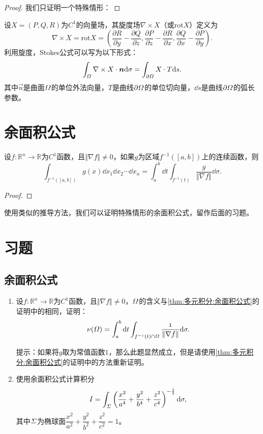    \begin{proof}
        我们只证明一个特殊情形：
    \end{proof}
    
    设\(X=(P,Q,R)\)为\(C^1\)的向量场，其旋度场\(\nabla\times X\)（或\(\mathrm{rot}X\)）定义为\[\nabla\times X=\mathrm{rot}X=\left(\frac{\partial R}{\partial y}-\frac{\partial Q}{\partial z},\frac{\partial P}{\partial z}-\frac{\partial R}{\partial x},\frac{\partial Q}{\partial x}-\frac{\partial P}{\partial y}\right).\]利用旋度，Stokes公式可以写为以下形式：\[\int_{\mit\Omega}\nabla\times X\cdot\boldsymbol{n}\mathrm{d}\sigma=\int_{\partial\mit\Omega}X\cdot T\mathrm{d} s.\]其中\(\vec{n}\)是曲面\(\mit\Omega\)的单位外法向量，\(T\)是曲线\(\partial\mit\Omega\)的单位切向量，\(\dd s\)是曲线\(\partial\mit\Omega\)的弧长参数。

\section{余面积公式}
    \begin{theorem}[余面积公式] \label{thm:多元积分:余面积公式}
        设\(f:\mathbb{R}^n\to\mathbb{R}\)为\(C^1\)函数，且\(\Vert\nabla f\Vert\neq0\)，如果\(g\)为区域\(f^{-1}(\left[a,b\right])\)上的连续函数，则\[\int_{f^{-1}(\left[a,b\right])}g(x)\dd x_1\dd x_2\cdots\dd x_n=\int_{a}^{b}\dd t\int_{f^{-1}(t)}\frac{g}{\Vert\nabla f\Vert}\dd\sigma.\]
    \end{theorem}


    \begin{proof}
        
    \end{proof}
    
    使用类似的推导方法，我们可以证明特殊情形的余面积公式，留作后面的习题。

\section{习题}
    \subsection{余面积公式}
    \begin{enumerate}
        \item 设\(f:\mathbb{R}^n\to\mathbb{R}\)为\(C^1\)函数，且\(\Vert\nabla f\Vert\neq0\)，\(\mit\Omega\)的含义与\autoref{thm:多元积分:余面积公式}的证明中的相同，证明：\[\nu(\mit\Omega)=\int_{a}^{b}\mathrm{d} t\int_{f^{-1}(t)\cap\mit\Omega}\frac{1}{\Vert\nabla f\Vert}\mathrm{d}\sigma.\]
        
        {\kaishu 提示：如果将\(g\)取为常值函数\(1\)，那么此题显然成立，但是请使用\autoref{thm:多元积分:余面积公式}的证明中的方法重新证明。}

        \item 使用余面积公式计算积分\[I = \int_{\mit\Sigma}\left(\frac{x^2}{a^4}+\frac{y^2}{b^4}+\frac{z^2}{c^4}\right)^{-\frac{1}{2}}\mathrm{d}\sigma,\]其中\(\mit\Sigma\)为椭球面\(\dfrac{x^2}{a^2}+\dfrac{y^2}{b^2}+\dfrac{z^2}{c^2}=1\)。
    \end{enumerate}